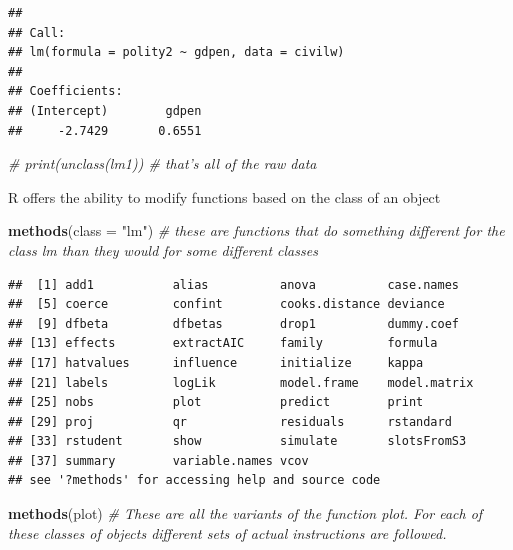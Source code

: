 \documentclass[]{article}
\newenvironment{Shaded}{\begin{snugshade}}{\end{snugshade}}
\newcommand{\KeywordTok}[1]{\textcolor[rgb]{0.13,0.29,0.53}{\textbf{#1}}}
\newcommand{\DataTypeTok}[1]{\textcolor[rgb]{0.13,0.29,0.53}{#1}}
\newcommand{\StringTok}[1]{\textcolor[rgb]{0.31,0.60,0.02}{#1}}
\newcommand{\CommentTok}[1]{\textcolor[rgb]{0.56,0.35,0.01}{\textit{#1}}}
\newcommand{\NormalTok}[1]{#1}
\begin{document}
\begin{verbatim}
## 
## Call:
## lm(formula = polity2 ~ gdpen, data = civilw)
## 
## Coefficients:
## (Intercept)        gdpen  
##     -2.7429       0.6551
\end{verbatim}

\begin{Shaded}
\begin{Highlighting}[]
\CommentTok{# print(unclass(lm1)) # that's all of the raw data}
\end{Highlighting}
\end{Shaded}

R offers the ability to modify functions based on the class of an object

\begin{Shaded}
\begin{Highlighting}[]
\KeywordTok{methods}\NormalTok{(}\DataTypeTok{class =} \StringTok{"lm"}\NormalTok{) }\CommentTok{# these are functions that do something different for the class lm than they would for some different classes}
\end{Highlighting}
\end{Shaded}

\begin{verbatim}
##  [1] add1           alias          anova          case.names    
##  [5] coerce         confint        cooks.distance deviance      
##  [9] dfbeta         dfbetas        drop1          dummy.coef    
## [13] effects        extractAIC     family         formula       
## [17] hatvalues      influence      initialize     kappa         
## [21] labels         logLik         model.frame    model.matrix  
## [25] nobs           plot           predict        print         
## [29] proj           qr             residuals      rstandard     
## [33] rstudent       show           simulate       slotsFromS3   
## [37] summary        variable.names vcov          
## see '?methods' for accessing help and source code
\end{verbatim}

\begin{Shaded}
\begin{Highlighting}[]
\KeywordTok{methods}\NormalTok{(plot) }\CommentTok{# These are all the variants of the function plot.  For each of these classes of objects different sets of actual instructions are followed.}
\end{Highlighting}
\end{Shaded}
\end{document}
